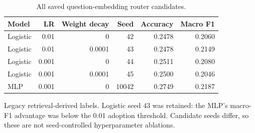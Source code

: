 \begin{table}[htbp]
\centering\small
\caption{All saved question-embedding router candidates.}
\label{tab:earlycandidates}
\begin{tabular}{@{}lrrrrr@{}}
\toprule
Model & LR & Weight decay & Seed & Accuracy & Macro F1\\
\midrule
Logistic & 0.01 & 0 & 42 & 0.2478 & 0.2060\\
Logistic & 0.01 & 0.0001 & 43 & 0.2478 & 0.2149\\
Logistic & 0.001 & 0 & 44 & 0.2511 & 0.2080\\
Logistic & 0.001 & 0.0001 & 45 & 0.2500 & 0.2046\\
MLP & 0.001 & 0 & 10042 & 0.2749 & 0.2187\\
\bottomrule
\end{tabular}
\par\smallskip\begin{minipage}{\textwidth}\footnotesize Legacy retrieval-derived labels. Logistic seed 43 was retained: the MLP's macro-F1 advantage was below the 0.01 adoption threshold. Candidate seeds differ, so these are not seed-controlled hyperparameter ablations.\end{minipage}
\end{table}
